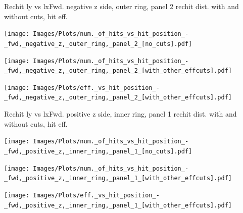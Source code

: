 \documentclass{beamer}
\begin{document}
\begin{frame}{Rechit ly vs lx}{Fwd. negative z side, outer ring, panel 2 rechit dist. with and without cuts, hit eff.}
  \begin{minipage}{0.32\textwidth}
    \centering
    \texttt{[image: Images/Plots/num.\_of\_hits\_vs\_hit\_position\_-\_fwd,\_negative\_z,\_outer\_ring,\_panel\_2\_[no\_cuts].pdf]}
  \end{minipage}%
  \begin{minipage}{0.32\textwidth}
    \centering
    \texttt{[image: Images/Plots/num.\_of\_hits\_vs\_hit\_position\_-\_fwd,\_negative\_z,\_outer\_ring,\_panel\_2\_[with\_other\_effcuts].pdf]}
  \end{minipage}%
  \begin{minipage}{0.32\textwidth}
    \centering
    \texttt{[image: Images/Plots/eff.\_vs\_hit\_position\_-\_fwd,\_negative\_z,\_outer\_ring,\_panel\_2\_[with\_other\_effcuts].pdf]}
  \end{minipage}
\end{frame}

\begin{frame}{Rechit ly vs lx}{Fwd. positive z side, inner ring, panel 1 rechit dist. with and without cuts, hit eff.}
  \begin{minipage}{0.32\textwidth}
    \centering
    \texttt{[image: Images/Plots/num.\_of\_hits\_vs\_hit\_position\_-\_fwd,\_positive\_z,\_inner\_ring,\_panel\_1\_[no\_cuts].pdf]}
  \end{minipage}%
  \begin{minipage}{0.32\textwidth}
    \centering
    \texttt{[image: Images/Plots/num.\_of\_hits\_vs\_hit\_position\_-\_fwd,\_positive\_z,\_inner\_ring,\_panel\_1\_[with\_other\_effcuts].pdf]}
  \end{minipage}%
  \begin{minipage}{0.32\textwidth}
    \centering
    \texttt{[image: Images/Plots/eff.\_vs\_hit\_position\_-\_fwd,\_positive\_z,\_inner\_ring,\_panel\_1\_[with\_other\_effcuts].pdf]}
  \end{minipage}
\end{frame}
\end{document}
